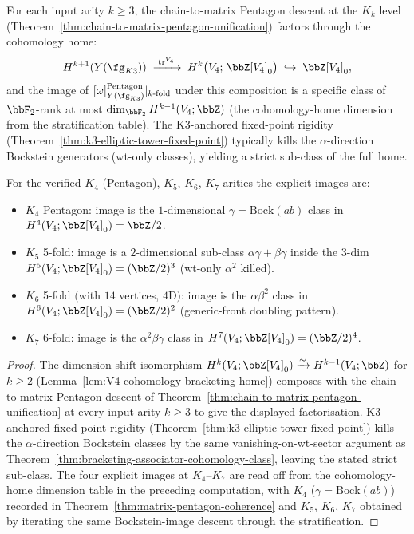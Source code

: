 \begin{corollary}
\label{cor:Kn-arity-cohomology-projection}
For each input arity $k \geq 3$, the chain-to-matrix Pentagon descent at
the $K_k$ level
\textup{(}Theorem~\ref{thm:chain-to-matrix-pentagon-unification}\textup{)}
factors through the cohomology home:
\[
 H^{k+1}(Y(\fg_{K3})) \;\xrightarrow{\;\mathrm{tr}^{V_4}\;}\;
 H^k\bigl(V_4;\, \bbZ[V_4]_0\bigr)
 \;\hookrightarrow\; \bbZ[V_4]_0,
\]
and the image of $[\omega]^{\mathrm{Pentagon}}_{Y(\fg_{K3})}|_{k\text{-fold}}$
under this composition is a specific class of $\bbF_2$-rank at most
$\dim_{\bbF_2} H^{k-1}(V_4; \bbZ)$ \textup{(}the cohomology-home dimension
from the stratification table\textup{).} The K$3$-anchored fixed-point
rigidity \textup{(}Theorem~\ref{thm:k3-elliptic-tower-fixed-point}\textup{)}
typically kills the $\alpha$-direction Bockstein generators \textup{(}wt-only
classes\textup{)}, yielding a strict sub-class of the full home.

For the verified $K_4$ \textup{(}Pentagon\textup{)}, $K_5$, $K_6$, $K_7$
arities the explicit images are:
\begin{itemize}
 \item $K_4$ Pentagon: image is the $1$-dimensional $\gamma = \mathrm{Bock}(ab)$
 class in $H^4(V_4; \bbZ[V_4]_0) = \bbZ/2$.
 \item $K_5$ 5-fold: image is a $2$-dimensional sub-class
 $\alpha\gamma + \beta\gamma$ inside the $3$-dim $H^5(V_4; \bbZ[V_4]_0) =
 (\bbZ/2)^3$ \textup{(}wt-only $\alpha^2$ killed\textup{).}
 \item $K_6$ 5-fold $($with $14$ vertices, $4$D$)$: image is the
 $\alpha\beta^2$ class in $H^6(V_4; \bbZ[V_4]_0) = (\bbZ/2)^2$
 \textup{(}generic-front doubling pattern\textup{).}
 \item $K_7$ 6-fold: image is the $\alpha^2\beta\gamma$ class in
 $H^7(V_4; \bbZ[V_4]_0) = (\bbZ/2)^4$.
\end{itemize}
\end{corollary}

\begin{proof}
The dimension-shift isomorphism
$H^k(V_4; \bbZ[V_4]_0) \xrightarrow{\sim} H^{k-1}(V_4; \bbZ)$ for
$k \geq 2$ (Lemma~\ref{lem:V4-cohomology-bracketing-home}) composes with
the chain-to-matrix Pentagon descent of
Theorem~\ref{thm:chain-to-matrix-pentagon-unification} at every input
arity $k \geq 3$ to give the displayed factorisation. K$3$-anchored
fixed-point rigidity (Theorem~\ref{thm:k3-elliptic-tower-fixed-point})
kills the $\alpha$-direction Bockstein classes by the same
vanishing-on-wt-sector argument as
Theorem~\ref{thm:bracketing-associator-cohomology-class}, leaving the
stated strict sub-class. The four explicit images at $K_4$--$K_7$ are
read off from the cohomology-home dimension table in the preceding
computation, with $K_4$ ($\gamma = \mathrm{Bock}(ab)$) recorded in
Theorem~\ref{thm:matrix-pentagon-coherence} and $K_5$, $K_6$, $K_7$
obtained by iterating the same Bockstein-image descent through the
stratification.
\end{proof}

